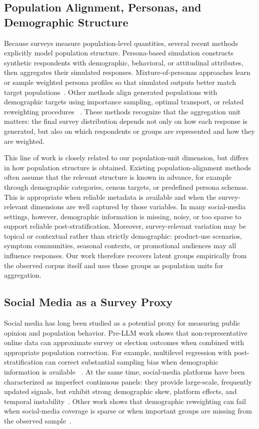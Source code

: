 \documentclass{article}
\begin{document}
\subsection{Population Alignment, Personas, and Demographic Structure}

Because surveys measure population-level quantities, several recent methods
explicitly model population structure.
Persona-based simulation constructs synthetic respondents with demographic,
behavioral, or attitudinal attributes, then aggregates their simulated
responses.
Mixture-of-personas approaches learn or sample weighted persona profiles so
that simulated outputs better match target populations~\cite{wang2024mixture}.
Other methods align generated populations with demographic targets using
importance sampling, optimal transport, or related reweighting procedures
~\cite{hwang2023aligning}.
These methods recognize that the aggregation unit matters:
the final survey distribution depends not only on how each response is
generated, but also on which respondents or groups are represented and how
they are weighted.

This line of work is closely related to our population-unit dimension, but
differs in how population structure is obtained.
Existing population-alignment methods often assume that the relevant
structure is known in advance, for example through demographic categories,
census targets, or predefined persona schemas.
This is appropriate when reliable metadata is available and when the
survey-relevant dimensions are well captured by those variables.
In many social-media settings, however, demographic information is missing,
noisy, or too sparse to support reliable post-stratification.
Moreover, survey-relevant variation may be topical or contextual rather than
strictly demographic: product-use scenarios, symptom communities, seasonal
contexts, or promotional audiences may all influence responses.
Our work therefore recovers latent groups empirically from the observed
corpus itself and uses those groups as population units for aggregation.

\subsection{Social Media as a Survey Proxy}

Social media has long been studied as a potential proxy for measuring public
opinion and population behavior.
Pre-LLM work shows that non-representative online data can approximate
survey or election outcomes when combined with appropriate population
correction.
For example, multilevel regression with post-stratification can correct
substantial sampling bias when demographic information is available
~\cite{wang2015forecasting}.
At the same time, social-media platforms have been characterized as
imperfect continuous panels: they provide large-scale, frequently updated
signals, but exhibit strong demographic skew, platform effects, and temporal
instability~\cite{diaz2016online}.
Other work shows that demographic reweighting can fail when social-media
coverage is sparse or when important groups are missing from the observed
sample~\cite{sen2017total}.
\end{document}
